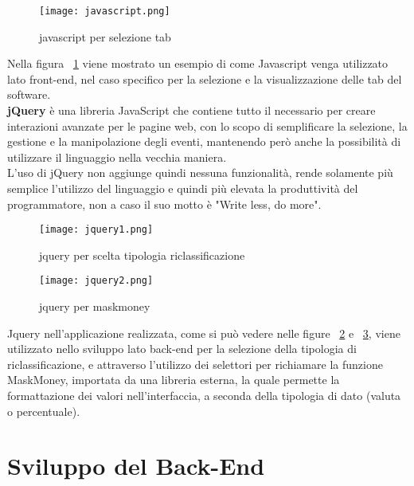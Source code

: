 \begin{figure}[H]
    \centering
    \texttt{[image: javascript.png]}
    \caption{javascript per selezione tab}
    \label{fig:javascript}
\end{figure}

Nella figura ~\ref{fig:javascript} viene mostrato un esempio di come Javascript venga utilizzato lato front-end, nel caso specifico per la selezione e la visualizzazione delle tab del software. \\


\textbf{jQuery} è una libreria JavaScript che contiene tutto il necessario per creare interazioni avanzate per le pagine web, con lo scopo di semplificare la selezione, la gestione e la manipolazione degli eventi, mantenendo però anche la possibilità di utilizzare il linguaggio nella vecchia maniera. \\
L'uso di jQuery non aggiunge quindi nessuna funzionalità, rende solamente più semplice l'utilizzo del linguaggio e quindi più elevata la produttività del programmatore, non a caso il suo motto è "Write less, do more".

\begin{figure}[H]
    \centering
    \texttt{[image: jquery1.png]}
    \caption{jquery per scelta tipologia riclassificazione}
    \label{fig:jquery1}
\end{figure}

\begin{figure}[H]
    \centering
    \texttt{[image: jquery2.png]}
    \caption{jquery per maskmoney}
    \label{fig:jquery2}
\end{figure}

Jquery nell'applicazione realizzata, come si può vedere nelle figure ~\ref{fig:jquery1} e ~\ref{fig:jquery2}, viene utilizzato nello sviluppo lato back-end per la selezione della tipologia di riclassificazione, e attraverso l'utilizzo dei selettori per richiamare la funzione MaskMoney, importata da una libreria esterna, la quale permette la formattazione dei valori nell'interfaccia, a seconda della tipologia di dato (valuta o percentuale).


\newpage

\section{Sviluppo del Back-End}

